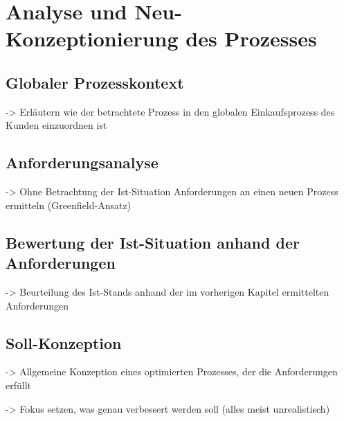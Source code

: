 \chapter{Analyse und Neu-Konzeptionierung des Prozesses}

\section{Globaler Prozesskontext}

-> Erläutern wie der betrachtete Prozess in den globalen Einkaufsprozess des Kunden einzuordnen ist

\section{Anforderungsanalyse}

-> Ohne Betrachtung der Ist-Situation Anforderungen an einen neuen Prozess ermitteln (Greenfield-Ansatz)

\section{Bewertung der Ist-Situation anhand der Anforderungen}

-> Beurteilung des Ist-Stands anhand der im vorherigen Kapitel ermittelten Anforderungen

\section{Soll-Konzeption}

-> Allgemeine Konzeption eines optimierten Prozesses, der die Anforderungen erfüllt

-> Fokus setzen, was genau verbessert werden soll (alles meist unrealistisch)